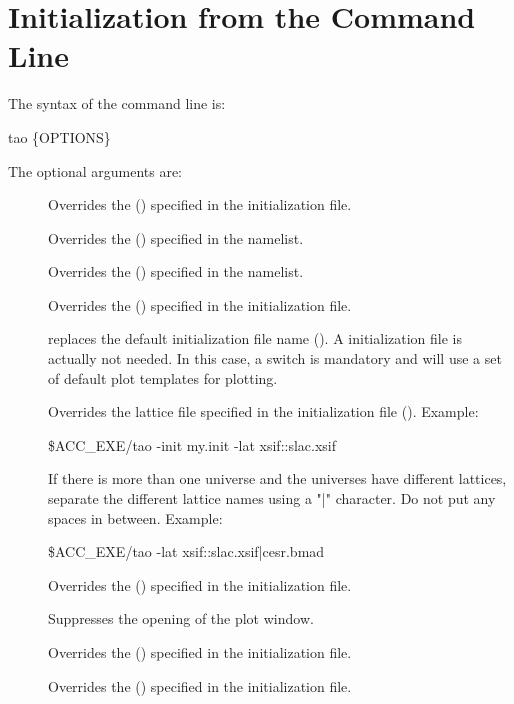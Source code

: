 \section{Initialization from the Command Line}
\label{s:command.line} 

The syntax of the command line is:
\begin{example}
  tao \{OPTIONS\}
\end{example}
The optional arguments are:
  \begin{description}
  \item[] \Newline
Overrides the  () specified in the
\tao initialization file.
  \item[] \Newline
Overrides the  () specified in the
 namelist.
  \item[] \Newline
Overrides the  () specified in the
 namelist.
  \item[] \Newline
Overrides the  () specified in the
\tao initialization file.
  \item[] \Newline
replaces the default initialization file name ().
A \tao initialization file is actually not needed. In this case, a
 switch is mandatory and \tao will use a set of default plot
templates for plotting.
  \item[] \Newline
Overrides the 
lattice file specified in the \tao initialization file
(). Example:
\begin{example}
  \$ACC_EXE/tao -init my.init -lat xsif::slac.xsif
\end{example}
If there is more than one universe and the universes have different
lattices, separate the different lattice names using a "|" character.
Do not put any spaces in between. Example:
\begin{example}
  \$ACC_EXE/tao -lat xsif::slac.xsif|cesr.bmad
\end{example}
  \item[] \Newline
Overrides the  () specified in the
\tao initialization file.
  \item[] \Newline
Suppresses the opening of the plot window.
  \item[] \Newline
Overrides the  () specified in the
\tao initialization file.
  \item[] \Newline
Overrides the  () specified in the
\tao initialization file.

\end{description}

